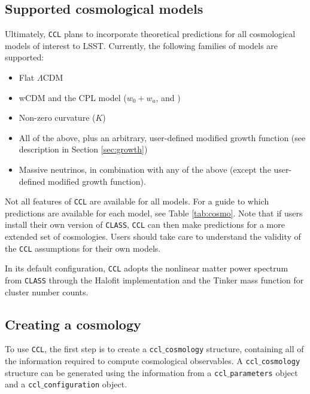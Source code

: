 \documentclass[\docopts]{\docclass}
\newcommand{\ccl}{{\tt CCL}\xspace}
\begin{document}













\subsection{Supported cosmological models}

\label{sec:cosmologies}
Ultimately, \ccl plans to incorporate theoretical predictions for all cosmological models of interest to LSST. Currently, the following families of models are supported:
\begin{itemize}
 \item Flat $\Lambda$CDM
 \item wCDM and the CPL model ($w_0+w_a$, \citealt{Chevallier01} and \citealt{Linder03})
 \item Non-zero curvature ($K$)
 \item All of the above, plus an arbitrary, user-defined modified growth function (see description in Section \ref{sec:growth})
  \item Massive neutrinos, in combination with any of the above (except the user-defined modified growth function).
\end{itemize}

Not all features of \ccl are available for all models. For a guide to which predictions are available for each model, see Table \ref{tab:cosmo}. Note that if users install their own version of {\tt CLASS}, {\tt CCL} can then make predictions for a more extended set of cosmologies. Users should take care to understand the validity of the {\tt CCL} assumptions for their own models.

In its default configuration, \ccl adopts the nonlinear matter power spectrum from {\tt CLASS} through the Halofit implementation and the Tinker mass function for cluster number counts.

\subsection{Creating a cosmology}

To use \ccl, the first step is to create a {\tt ccl$\_$cosmology} structure, containing all of the information required to compute cosmological observables. A {\tt ccl$\_$cosmology} structure can be generated using the information from a {\tt ccl$\_$parameters} object and a {\tt ccl$\_$configuration} object.
\end{document}
